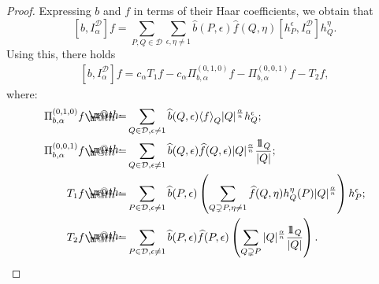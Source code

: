 \documentclass[12pt]{amsart}
\begin{document}
\begin{proof}
Expressing $b$ and $f$ in terms of their Haar coefficients, we obtain that
	$$
	[b, I^{\mathcal{D}}_{\alpha}] f = \sum_{P, Q \in {\mathcal{D}}} 
	\sum_{{\epsilon},\eta\neq 1} \widehat{b}(P,{\epsilon}) \widehat{f}(Q,\eta) 
	[h_P^{\epsilon}, I_{\alpha}^{\mathcal{D}}] h^{\eta}_Q.
	$$
Using this, there holds
\begin{align}\label{E:Decomp}
[b, I^{\mathcal{D}}_{\alpha}]f = 
  c_{\alpha} T_1 f - c_{\alpha} \Pi_{b,\alpha}^{(0,1,0)}f 
  - \Pi_{b,\alpha}^{(0,0,1)}f - T_2f,
\end{align}
where:
\begin{align*}
\Pi_{b,\alpha}^{(0,1,0)} f &{\mathrel{\rlap{                     \raisebox{0.3ex}{$\m@th\cdot$}}                     \raisebox{-0.3ex}{$\m@th\cdot$}}                     =}  \sum_{Q\in{\mathcal{D}},{\epsilon}\neq 1} \widehat{b}(Q,{\epsilon}) {\langle } f{\rangle }_Q |Q|^{\frac{\alpha}{n}} h_Q^{\epsilon};\\
\Pi_{b,\alpha}^{(0,0,1)} f & {\mathrel{\rlap{                     \raisebox{0.3ex}{$\m@th\cdot$}}                     \raisebox{-0.3ex}{$\m@th\cdot$}}                     =} \sum_{Q\in{\mathcal{D}},{\epsilon}\neq 1} \widehat{b}(Q,{\epsilon}) \widehat{f}(Q,{\epsilon}) |Q|^{\frac{\alpha}{n}} \frac{{1\!\!1}_Q}{|Q|};\\
T_1 f & {\mathrel{\rlap{                     \raisebox{0.3ex}{$\m@th\cdot$}}                     \raisebox{-0.3ex}{$\m@th\cdot$}}                     =} \sum_{P\in{\mathcal{D}},{\epsilon}\neq 1} \widehat{b}(P,{\epsilon}) \left( \sum_{Q \supsetneq P, \eta\neq 1} \widehat{f}(Q,\eta) h_Q^{\eta}(P) |Q|^{\frac{\alpha}{n}} \right) h_P^{\epsilon};\\
T_2 f & {\mathrel{\rlap{                     \raisebox{0.3ex}{$\m@th\cdot$}}                     \raisebox{-0.3ex}{$\m@th\cdot$}}                     =} \sum_{P\in{\mathcal{D}},{\epsilon}\neq 1} \widehat{b}(P,{\epsilon}) \widehat{f}(P,{\epsilon}) \left( \sum_{Q \supsetneq P} |Q|^{\frac{\alpha}{n}} \frac{{1\!\!1}_Q}{|Q|} \right).
\end{align*}


\end{proof}
\end{document}
